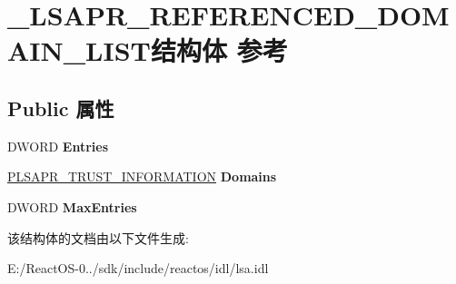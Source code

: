 \hypertarget{struct___l_s_a_p_r___r_e_f_e_r_e_n_c_e_d___d_o_m_a_i_n___l_i_s_t}{}\section{\+\_\+\+L\+S\+A\+P\+R\+\_\+\+R\+E\+F\+E\+R\+E\+N\+C\+E\+D\+\_\+\+D\+O\+M\+A\+I\+N\+\_\+\+L\+I\+S\+T结构体 参考}
\label{struct___l_s_a_p_r___r_e_f_e_r_e_n_c_e_d___d_o_m_a_i_n___l_i_s_t}
\subsection*{Public 属性}
\begin{DoxyCompactItemize}
\item 
\mbox{\label{struct___l_s_a_p_r___r_e_f_e_r_e_n_c_e_d___d_o_m_a_i_n___l_i_s_t_a0dc3117a973603f27ca55fd95bf1d753}} 
D\+W\+O\+RD {\bfseries Entries}
\item 
\mbox{\label{struct___l_s_a_p_r___r_e_f_e_r_e_n_c_e_d___d_o_m_a_i_n___l_i_s_t_a7b041ca9fc324313cfd7623f4a6a00a5}} 
\hyperlink{struct___l_s_a_p_r___t_r_u_s_t___i_n_f_o_r_m_a_t_i_o_n}{P\+L\+S\+A\+P\+R\+\_\+\+T\+R\+U\+S\+T\+\_\+\+I\+N\+F\+O\+R\+M\+A\+T\+I\+ON} {\bfseries Domains}
\item 
\mbox{\label{struct___l_s_a_p_r___r_e_f_e_r_e_n_c_e_d___d_o_m_a_i_n___l_i_s_t_a0b4046b3a6b951fcf975cc45b86ec524}} 
D\+W\+O\+RD {\bfseries Max\+Entries}
\end{DoxyCompactItemize}


该结构体的文档由以下文件生成\+:\begin{DoxyCompactItemize}
\item 
E\+:/\+React\+O\+S-\/0../sdk/include/reactos/idl/lsa.\+idl\end{DoxyCompactItemize}
